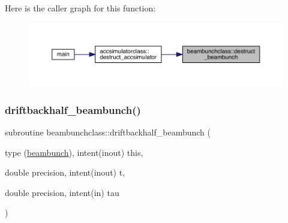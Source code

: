 Here is the caller graph for this function\+:\nopagebreak
\begin{figure}[H]
\begin{center}
\leavevmode
\includegraphics[width=350pt]{namespacebeambunchclass_a0fe1e4d236f209b18f75b272bf07782d_icgraph}
\end{center}
\end{figure}
\mbox{\label{namespacebeambunchclass_ae62dcc6dbc6d31b22daefa701822d49d}} 
\subsubsection{\texorpdfstring{driftbackhalf\_beambunch()}{driftbackhalf\_beambunch()}}
{\footnotesize\ttfamily subroutine beambunchclass\+::driftbackhalf\+\_\+beambunch (\begin{DoxyParamCaption}\item[{type (\mbox{\hyperlink{namespacebeambunchclass_structbeambunchclass_1_1beambunch}{beambunch}}), intent(inout)}]{this,  }\item[{double precision, intent(inout)}]{t,  }\item[{double precision, intent(in)}]{tau }\end{DoxyParamCaption})}

